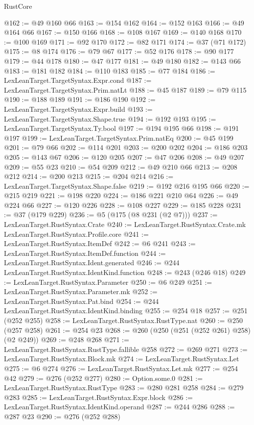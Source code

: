 \begin{lexlean}{RustCore}
\begin{coremodule}
@162 := @49 @160 @66
@163 := @154 @162
@164 := @152 @163
@166 := @49 @164 @66
@167 := @150 @166
@168 := @108 @167
@169 := @140 @168
@170 := @100 @169
@171 := @92 @170
@172 := @82 @171
@174 := @37 (@71 @172)
@175 := @8 @174
@176 := @79 @67
@177 := @52 @176
@178 := @90 @177
@179 := @44 @178
@180 := @47 @177
@181 := @49 @180
@182 := @143 @66
@183 := @181 @182
@184 := @110 @183
@185 := @77 @184
@186 := LexLeanTarget.TargetSyntax.Expr.cond
@187 := LexLeanTarget.TargetSyntax.Prim.natLt
@188 := @45 @187
@189 := @79 @115
@190 := @188 @189
@191 := @186 @190
@192 := LexLeanTarget.TargetSyntax.Expr.build
@193 := LexLeanTarget.TargetSyntax.Shape.true
@194 := @192 @193
@195 := LexLeanTarget.TargetSyntax.Ty.bool
@197 := @194 @195 @66
@198 := @191 @197
@199 := LexLeanTarget.TargetSyntax.Prim.natEq
@200 := @45 @199
@201 := @79 @66
@202 := @114 @201
@203 := @200 @202
@204 := @186 @203
@205 := @143 @67
@206 := @120 @205
@207 := @47 @206
@208 := @49 @207
@209 := @55 @23
@210 := @54 @209
@212 := @49 @210 @66
@213 := @208 @212
@214 := @200 @213
@215 := @204 @214
@216 := LexLeanTarget.TargetSyntax.Shape.false
@219 := @192 @216 @195 @66
@220 := @215 @219
@221 := @198 @220
@224 := @186 @221 @210 @64
@226 := @49 @224 @66
@227 := @120 @226
@228 := @108 @227
@229 := @185 @228
@231 := @37 (@179 @229)
@236 := @5 (@175 (@8 @231 (@2 @7)))
@237 := LexLeanTarget.RustSyntax.Crate
@240 := LexLeanTarget.RustSyntax.Crate.mk LexLeanTarget.RustSyntax.Profile.core
@241 := LexLeanTarget.RustSyntax.ItemDef
@242 := @6 @241
@243 := LexLeanTarget.RustSyntax.ItemDef.function
@244 := LexLeanTarget.RustSyntax.Ident.generated
@246 := @244 LexLeanTarget.RustSyntax.IdentKind.function
@248 := @243 (@246 @18)
@249 := LexLeanTarget.RustSyntax.Parameter
@250 := @6 @249
@251 := LexLeanTarget.RustSyntax.Parameter.mk
@252 := LexLeanTarget.RustSyntax.Pat.bind
@254 := @244 LexLeanTarget.RustSyntax.IdentKind.binding
@255 := @254 @18
@257 := @251 (@252 @255)
@258 := LexLeanTarget.RustSyntax.RustType.nat
@260 := @250 (@257 @258)
@261 := @254 @23
@268 := @260 (@250 (@251 (@252 @261) @258) (@2 @249))
@269 := @248 @268
@271 := LexLeanTarget.RustSyntax.RustType.fallible @258
@272 := @269 @271
@273 := LexLeanTarget.RustSyntax.Block.mk
@274 := LexLeanTarget.RustSyntax.Let
@275 := @6 @274
@276 := LexLeanTarget.RustSyntax.Let.mk
@277 := @254 @42
@279 := @276 (@252 @277)
@280 := Option.some.{0}
@281 := LexLeanTarget.RustSyntax.RustType
@283 := @280 @281 @258
@284 := @279 @283
@285 := LexLeanTarget.RustSyntax.Expr.block
@286 := LexLeanTarget.RustSyntax.IdentKind.operand
@287 := @244 @286
@288 := @287 @23
@290 := @276 (@252 @288)

\end{coremodule}
\end{lexlean}
